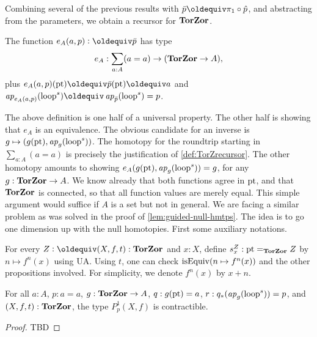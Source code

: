 \documentclass[a4,12pt]{amsart}
\begin{document}
Combining several of the previous results with 
$\bar{p}\jdeq \pi_1 \circ \hat{p}$, and abstracting from the
parameters, we obtain a recursor for $\mathbf{TorZor}$.

\begin{definition}\label{def:TorZrecursor}
The function $e_A(a,p) \defeq \bar{p}$ has type
\[
e_A : \sum_{a:A}(a=a) \to (\mathbf{TorZor} \to A),
\]
plus $e_A(a,p)(\pt) \jdeq \bar{p}(\pt) \jdeq a$ and 
$\ap{e_A(a,p)}(\Zloop)\jdeq\ap{\bar{p}}(\Zloop) = p$.
\end{definition}

The above definition is one half of a universal property.
The other half is showing that $e_A$ is an equivalence.
The obvious candidate for an inverse is 
$g\mapsto (g({\mathord{\mathrm{pt}}}),\mathop{{\it ap}_{g}}(\mathrm{loop}^s))$.
The homotopy for the roundtrip starting in $\sum_{a:A}(a=a)$
is precisely the justification of \cref{def:TorZrecursor}.
The other homotopy amounts to showing
$e_A(g({\mathord{\mathrm{pt}}}),\mathop{{\it ap}_{g}}(\mathrm{loop}^s)) = g$, for any $g:\mathbf{TorZor}\to A$.
We know already that both functions agree in ${\mathord{\mathrm{pt}}}$,
and that $\mathbf{TorZor}$ is connected, so that all function values
are merely equal. This simple argument would suffice if
$A$ is a set but not in general. We are facing a similar
problem as was solved in the proof of \cref{lem:guided-null-hmtps}.
The idea is to go one dimension up with the null homotopies.
First some auxiliary notations.

\begin{definition}\label{def:loop-s-iterated}
For every $Z\defeq(X,f,t):\TorZ$ and $x:X$, 
define $s^Z_x: {\mathord{\mathrm{pt}}} =_{\mathbf{TorZor}} Z$ by $n\mapsto f^n(x)$ using UA. 
Using $t$, one can check $\mathrm{isEquiv}(n\mapsto f^n(x))$
and the other propositions involved. 
For simplicity, we denote $f^n(x)$ by $x+n$.
\end{definition}








\begin{lemma}\label{lem:redo-g-null-hmtps}
For all $a:A$, $p:a=a$, $g:\mathbf{TorZor}\to A$,
$q: g({\mathord{\mathrm{pt}}}) = a$, $r: q_*(\mathop{{\it ap}_{g}}(\mathrm{loop}^s)) = p$, 
and $(X,f,t):\mathbf{TorZor}$, the type $P^1_p(X,f)$ is contractible.
\end{lemma}
\begin{proof}
TBD
\end{proof}






\end{document}
